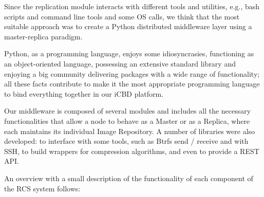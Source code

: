 
Since the replication module interacts with different tools and utilities, e.g., bash scripts and command line tools and some OS calls, we think that the most suitable approach was to create a Python distributed middleware layer using a master-replica paradigm.

Python, as a programming language, enjoys some idiosyncrasies, functioning as an object-oriented language, possessing an extensive standard library and enjoying a big community delivering packages with a wide range of functionality; all these facts contribute to make it the most appropriate programming language to bind everything together in our iCBD platform.

Our middleware is composed of several modules and includes all the necessary functionalities that allow a node to behave as a Master or as a Replica, where each maintains its individual Image Repository. A number of libraries were also developed: to interface with some tools, such as Btrfs send / receive and with SSH, to build wrappers for compression algorithms, and even to provide a REST API.

An overview with a small description of the functionality of each component of the RCS system follows:

